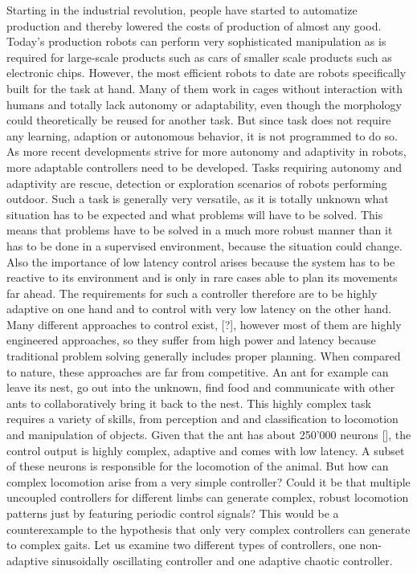 \documentclass[main]{subfiles}
\begin{document}
Starting in the industrial revolution, people have started to automatize production and thereby lowered the costs of production of almost any good. Today's production robots can perform very sophisticated manipulation as is required for large-scale products such as cars of smaller scale products such as electronic chips. However, the most efficient robots to date are robots specifically built for the task at hand. Many of them work in cages without interaction with humans and totally lack autonomy or adaptability, even though the morphology could theoretically be reused for another task. But since task does not require any learning, adaption or autonomous behavior, it is not programmed to do so. As more recent developments strive for more autonomy and adaptivity in robots, more adaptable controllers need to be developed. Tasks requiring autonomy and adaptivity are rescue, detection or exploration scenarios of robots performing outdoor. Such a task is generally very versatile, as it is totally unknown what situation has to be expected and what problems will have to be solved. This means that problems have to be solved in a much more robust manner than it has to be done in a supervised environment, because the situation could change. Also the importance of low latency control arises because the system has to be reactive to its environment and is only in rare cases able to plan its movements far ahead. The requirements for such a controller therefore are to be highly adaptive on one hand and to control with very low latency on the other hand. Many different approaches to control exist, [?], however most of them are highly engineered approaches, so they suffer from high power and latency because traditional problem solving generally includes proper planning.  When compared to nature, these approaches are far from competitive. An ant for example can leave its nest, go out into the unknown, find food and communicate with other ants to collaboratively bring it back to the nest. This highly complex task requires a variety of skills, from perception and and classification to locomotion and manipulation of objects. Given that the ant has about 250'000 neurons [], the control output is highly complex, adaptive and comes with low latency. A subset of these neurons is responsible for the locomotion of the animal. But how can complex locomotion arise from a very simple controller? Could it be that multiple uncoupled controllers for different limbs can generate complex, robust locomotion patterns just by featuring periodic control signals? This would be a counterexample to the hypothesis that only very complex controllers can generate to complex gaits. Let us examine two different types of controllers, one non-adaptive sinusoidally oscillating controller and one adaptive chaotic controller.
\end{document}
